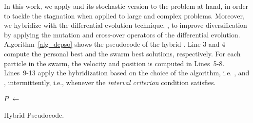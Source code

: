 In this work, we apply \hcpso{} and its stochastic version \shpso{} to the problem at hand, in order to tackle the \pso{} stagnation when applied to large and complex problems. Moreover, we hybridize \pso{} with the differential evolution technique, \depso{}, to improve diversification by applying the mutation and cross-over operators of the differential evolution. Algorithm~\ref{alg_depso} shows the pseudocode of the hybrid \pso{}. Line 3 and 4 compute the personal best and the swarm best solutions, respectively. For each particle in the swarm, the velocity and position is computed in Lines~5-8. Lines~9-13 apply the hybridization based on the choice of the algorithm, i.e. \de, \hcpso{} and \shpso{}, intermittently, i.e., whenever the \textit{interval criterion} condition satisfies.
\IncMargin{1em}
\begin{algorithm}[H]
	\SetAlgoLined
	
	\BlankLine
	\BlankLine
	\Particles $P$ $\leftarrow$ \InitPSO{}\;
	\BlankLine
	\caption{Hybrid \pso{} Pseudocode.}
	\label{alg_depso}
\end{algorithm}\DecMargin{1em}

